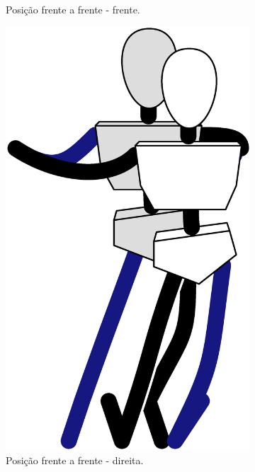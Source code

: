 \begin{figure}[!ht]
\begin{subfigure}[b]{0.20\textwidth}
         \caption{Posição frente a frente - frente.}
         \label{fig:positiongeralsamba:fff}
     \end{subfigure}
     \hfill
     \begin{subfigure}[b]{0.245\textwidth}
         \centering
         \includegraphics[width=\textwidth]{chapters/cap-normas/position-ffd.eps}
         \caption{Posição frente a frente - direita.}
         \label{fig:positiongeralsamba:ffd}
     \end{subfigure}
     \hfill
     \begin{subfigure}[b]{0.285\textwidth}

\end{subfigure}
\end{figure}
